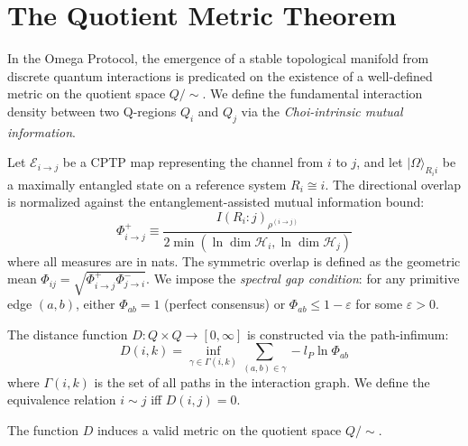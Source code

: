 \documentclass[11pt,template]{article}
\newcommand{\HCal}{\mathcal{H}}
\begin{document}
\section{The Quotient Metric Theorem}

In the Omega Protocol, the emergence of a stable topological manifold from discrete quantum interactions is predicated on the existence of a well-defined metric on the quotient space $Q/\sim$. We define the fundamental interaction density between two Q-regions $Q_i$ and $Q_j$ via the \textit{Choi-intrinsic mutual information}.

Let $\mathcal{E}_{i \to j}$ be a CPTP map representing the channel from $i$ to $j$, and let $|\Omega\rangle_{R_i i}$ be a maximally entangled state on a reference system $R_i \cong i$. The directional overlap is normalized against the entanglement-assisted mutual information bound:
\begin{equation}
    \Phi^+_{i \to j} \equiv \frac{I(R_i:j)_{\rho^{(i \to j)}}}{2 \min(\ln \dim \HCal_i, \ln \dim \HCal_j)}
\end{equation}
where all measures are in nats. The symmetric overlap is defined as the geometric mean $\Phi_{ij} = \sqrt{\Phi^+_{i \to j} \Phi^-_{j \to i}}$. We impose the \textit{spectral gap condition}: for any primitive edge $(a,b)$, either $\Phi_{ab} = 1$ (perfect consensus) or $\Phi_{ab} \le 1 - \varepsilon$ for some $\varepsilon > 0$.

The distance function $D: Q \times Q \to [0, \infty]$ is constructed via the path-infimum:
\begin{equation}
    D(i,k) = \inf_{\gamma \in \Gamma(i,k)} \sum_{(a,b) \in \gamma} -l_P \ln \Phi_{ab}
\end{equation}
where $\Gamma(i,k)$ is the set of all paths in the interaction graph. We define the equivalence relation $i \sim j$ iff $D(i,j) = 0$.

\begin{theorem}
The function $D$ induces a valid metric on the quotient space $Q/\sim$.
\end{theorem}
\end{document}
